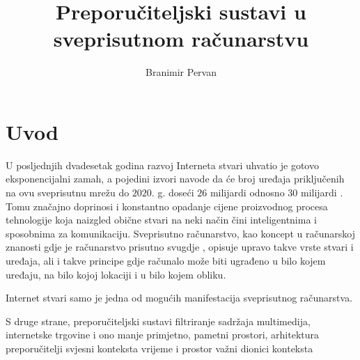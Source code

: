 \documentclass[times, utf8, diplomski, numeric]{fer}
\begin{document}
\title{Preporučiteljski sustavi u sveprisutnom računarstvu}
\author{Branimir Pervan}
\maketitle

\izvornik


\tableofcontents


\chapter{Uvod}
U posljednjih dvadesetak godina razvoj Interneta stvari  uhvatio je gotovo eksponencijalni zamah, a pojedini izvori navode da
će broj uređaja priključenih na ovu sveprisutnu mrežu do $2020$. g. doseći $26$
milijardi \cite{gartner2013Iot} odnosno $30$ milijardi \cite{ABI2013Iot}. Tomu
značajno doprinosi i konstantno opadanje cijene proizvodnog procesa tehnologije
koja naizgled obične stvari na neki način čini inteligentnima i sposobnima za
komunikaciju. 
Sveprisutno računarstvo, kao koncept u računarskoj znanosti
gdje je računarstvo prisutno svugdje \cite{theComputerWeiser}, opisuje upravo 
takve vrste stvari i uređaja, ali i takve principe gdje računalo može biti
ugrađeno u bilo kojem uređaju, na bilo kojoj lokaciji i u bilo kojem obliku.

Internet stvari samo je jedna od mogućih manifestacija sveprisutnog računarstva.

S druge strane, preporučiteljski sustavi
filtriranje sadržaja
multimedija, internetske trgovine
i ono manje primjetno, pametni prostori, arhitektura 
preporučitelji svjesni konteksta
vrijeme i prostor važni dionici konteksta
\end{document}
